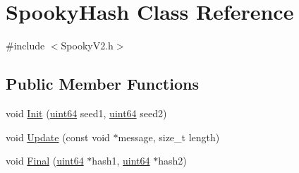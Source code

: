 \hypertarget{classSpookyHash}{}\section{Spooky\+Hash Class Reference}
\label{classSpookyHash}


{\ttfamily \#include $<$Spooky\+V2.\+h$>$}

\subsection*{Public Member Functions}
\begin{DoxyCompactItemize}
\item 
void \hyperlink{classSpookyHash_acba9d3327d8576d4126b15f301a17282}{Init} (\hyperlink{SpookyV2_8h_abc0f5bc07737e498f287334775dff2b6}{uint64} seed1, \hyperlink{SpookyV2_8h_abc0f5bc07737e498f287334775dff2b6}{uint64} seed2)
\item 
void \hyperlink{classSpookyHash_a1a95761b21aa9d827ad9b62f56a30877}{Update} (const void $\ast$message, size\+\_\+t length)
\item 
void \hyperlink{classSpookyHash_ae37b93d6c4386e1879cec667ab6c103e}{Final} (\hyperlink{SpookyV2_8h_abc0f5bc07737e498f287334775dff2b6}{uint64} $\ast$hash1, \hyperlink{SpookyV2_8h_abc0f5bc07737e498f287334775dff2b6}{uint64} $\ast$hash2)
\end{DoxyCompactItemize}
